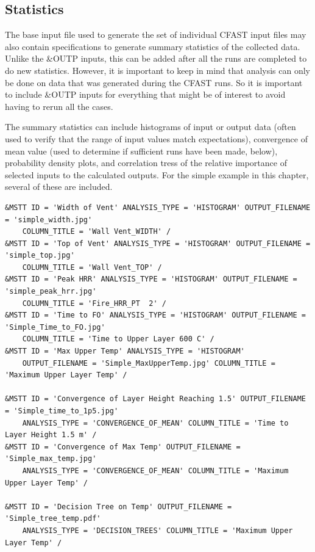 \documentclass[12pt,twoside]{book}
\begin{document}
\subsection{Statistics}

The base input file used to generate the set of individual CFAST input files may also contain specifications to generate summary statistics of the collected data. Unlike the {\ct \&OUTP} inputs, this can be added after all the runs are completed to do new statistics. However, it is important to keep in mind that analysis can only be done on data that was generated during the CFAST runs. So it is important to include {\ct \&OUTP} inputs for everything that might be of interest to avoid having to rerun all the cases.

The summary statistics can include histograms of input or output data (often used to verify that the range of input values match expectations), convergence of mean value (used to determine if sufficient runs have been made, below), probability density plots, and correlation tress of the relative importance of selected inputs to the calculated outputs. For the simple example in this chapter, several of these are included.

\begin{lstlisting}[language=cdata, basicstyle=\scriptsize]
&MSTT ID = 'Width of Vent' ANALYSIS_TYPE = 'HISTOGRAM' OUTPUT_FILENAME = 'simple_width.jpg'
	COLUMN_TITLE = 'Wall Vent_WIDTH' /
&MSTT ID = 'Top of Vent' ANALYSIS_TYPE = 'HISTOGRAM' OUTPUT_FILENAME = 'simple_top.jpg'
	COLUMN_TITLE = 'Wall Vent_TOP' /
&MSTT ID = 'Peak HRR' ANALYSIS_TYPE = 'HISTOGRAM' OUTPUT_FILENAME = 'simple_peak_hrr.jpg'
	COLUMN_TITLE = 'Fire_HRR_PT  2' /
&MSTT ID = 'Time to FO' ANALYSIS_TYPE = 'HISTOGRAM' OUTPUT_FILENAME = 'Simple_Time_to_FO.jpg'
	COLUMN_TITLE = 'Time to Upper Layer 600 C' /
&MSTT ID = 'Max Upper Temp' ANALYSIS_TYPE = 'HISTOGRAM'
	OUTPUT_FILENAME = 'Simple_MaxUpperTemp.jpg' COLUMN_TITLE = 'Maximum Upper Layer Temp' /

&MSTT ID = 'Convergence of Layer Height Reaching 1.5' OUTPUT_FILENAME = 'Simple_time_to_1p5.jpg'
	ANALYSIS_TYPE = 'CONVERGENCE_OF_MEAN' COLUMN_TITLE = 'Time to Layer Height 1.5 m' /
&MSTT ID = 'Convergence of Max Temp' OUTPUT_FILENAME = 'Simple_max_temp.jpg'
	ANALYSIS_TYPE = 'CONVERGENCE_OF_MEAN' COLUMN_TITLE = 'Maximum Upper Layer Temp' /

&MSTT ID = 'Decision Tree on Temp' OUTPUT_FILENAME = 'Simple_tree_temp.pdf'
	ANALYSIS_TYPE = 'DECISION_TREES' COLUMN_TITLE = 'Maximum Upper Layer Temp' /
\end{lstlisting}
\end{document}
